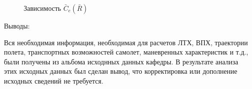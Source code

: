 \begin{figure}[H]
    \caption{Зависимость $\bar{C}_{e}(\bar{R})$}
    \label{fig:Ce}
\end{figure}

\begin{center}
    Выводы:
\end{center}

 Вся необходимая информация, необходимая для расчетов ЛТХ, ВПХ, траектории полета, транспортных возможностей самолет, маневренных характеристик и т.д., были получены из альбома
 исходнных данных кафедры. В результате анализа этих исходных данных был сделан вывод, что корректировка или дополнение исходных сведений не требуется. 



